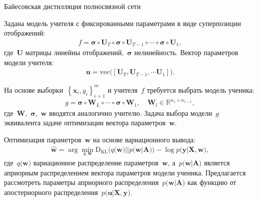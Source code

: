 \documentclass[10pt,pdf,hyperref={unicode}]{beamer}
\begin{document}
\begin{frame}{Байесовская дистилляция полносвязной сети}

Задана модель учителя с фиксированными параметрами в виде суперпозиции отображений:
\[
\begin{aligned}
f = \bm{\sigma} \circ \mathbf{U}_T \circ \bm{\sigma} \circ \mathbf{U}_{T-1} \circ \cdots \circ \bm{\sigma} \circ \mathbf{U}_1,
\end{aligned}
\]
где~$\mathbf{U}$ матрицы линейны отображений,~$\bm{\sigma}$ нелинейность. Вектор параметров модели учителя:
\[
\begin{aligned}
\mathbf{u} = \text{vec}\bigr(\left[\mathbf{U}_T, \mathbf{U}_{T-1}, \cdots \mathbf{U}_1\right]\bigr).
\end{aligned}
\]

На основе выборки~$\left\{\mathbf{x}_i, y_i\right\}_{i=1}^{m}$ и учителя~$f$ требуется выбрать модель ученика:
\[
\begin{aligned}
g = \bm{\sigma} \circ \mathbf{W}_L \circ \cdots \circ \bm{\sigma} \circ \mathbf{W}_1, \quad \mathbf{W}_l \in \mathbb{R}^{n_s \times n_{s-1}},
\end{aligned}
\]
где~$\mathbf{W}$,~$\bm{\sigma}$,~$\mathbf{w}$ вводятся аналогично учителю. Задача выбора модели~$g$ эквивалента задаче оптимизации вектора параметров~$\mathbf{w}$.

Оптимизация параметров~$\mathbf{w}$ на основе вариационного вывода:
\[
\begin{aligned}
\hat{\mathbf{w}} = \arg \min_{q, \mathbf{w}} \text{D}_{\text{KL}}\bigr(q\bigr(\mathbf{w}\bigr)||p\bigr(\mathbf{w}|\mathbf{A}\bigr)\bigr) - \log p\bigr(\mathbf{y}|\mathbf{X}, \mathbf{w}\bigr),
\end{aligned}
\]
где~$q\bigr(\mathbf{w}\bigr)$ вариационное распределение параметров~$\mathbf{w}$, а~$p\bigr(\mathbf{w}| \mathbf{A}\bigr)$ является априорным распределением вектора параметров модели ученика. Предлагается рассмотреть параметры априорного распределения~$p\bigr(\mathbf{w}|\mathbf{A}\bigr)$ как функцию от апостериорного распределения~$p\bigr(\mathbf{u}|\mathbf{X}, \mathbf{y}\bigr)$.

\end{frame}
\end{document}
